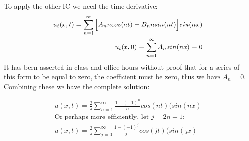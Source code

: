 \documentclass{article}
\begin{document}
To apply the other IC we need the time derivative:
\begin{equation}
\begin{aligned}
u_t(x,t) = \sum_{n=1}^{\infty}\Big{[}A_nncos(nt) - B_nnsin(nt)\Big{]}sin(nx)\\
u_t(x,0) =\sum_{n=1}^{\infty} A_nsin(nx) = 0
\end{aligned}
\end{equation}
It has been asserted in class and office hours without proof that for a series of this form to be equal to zero, the coefficient must be zero, thus we have $A_n = 0$. Combining these we have the complete solution:
\begin{tcolorbox}[minipage,colback=white,arc=0pt,outer arc=0pt]
\begin{equation}
\begin{aligned}
u(x,t) = \frac{2}{\pi}\sum_{n=1}^{\infty}\frac{1 -(-1)^n}{n}cos(nt)(sin(nx)\\
\text{Or perhaps more efficiently, let $j=2n+1$:}\\
u(x,t) = \frac{2}{\pi}\sum_{j=0}^{\infty}\frac{1 -(-1)^j}{j}cos(jt)(sin(jx)\\
\end{aligned}
\end{equation}
\end{tcolorbox}
\end{document}
